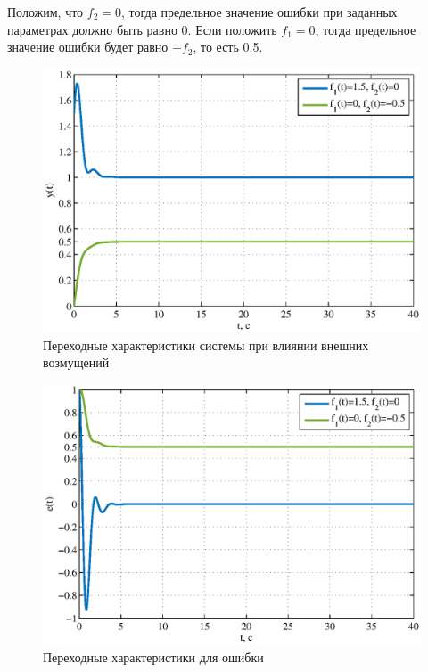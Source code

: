 \documentclass[a4paper,12pt]{article} %
\begin{document}
Положим, что $f_2=0$, тогда предельное значение ошибки при заданных параметрах должно быть равно 0. Если положить  $f_1=0$, тогда предельное значение ошибки будет равно $-f_2$, то есть 0.5.
\begin{figure}[H]
    \centering
    \includegraphics[width=1\linewidth]{scheme/plot11y.eps}
    \caption{Переходные характеристики системы при влиянии внешних возмущений}
\end{figure}
\begin{figure}[H]
    \centering
    \includegraphics[width=1\linewidth]{scheme/plot12e.eps}
    \caption{Переходные характеристики для ошибки}
\end{figure}
\end{document}
